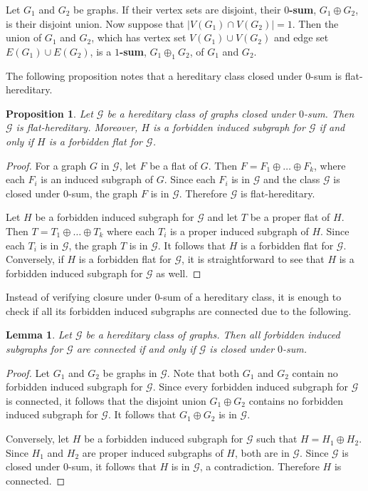 \documentclass[11pt]{amsart}
\newtheorem{lemma}[theorem]{Lemma}
\newtheorem{proposition}[theorem]{Proposition}
\theoremstyle{definition}
\theoremstyle{remark}
\numberwithin{equation}{section}
\begin{document}
Let $G_1$ and $G_2$ be graphs. If their vertex sets are disjoint, their {\bf $0$-sum}, $G_1 \oplus G_2$, is their disjoint union. Now suppose that $|V(G_1) \cap V(G_2)| = 1$. Then the union of $G_1$ and $G_2$, which has vertex set $V(G_1) \cup V(G_2)$ and edge set $E(G_1) \cup E(G_2)$, is a {\bf $1$-sum}, $G_1 \oplus_1 G_2$, of $G_1$ and $G_2$.


The following proposition notes that a hereditary class closed under $0$-sum is flat-hereditary.


\begin{proposition}
\label{prop_b}
Let $\mathcal{G}$ be a hereditary class of graphs closed under $0$-sum. Then $\mathcal{G}$ is flat-hereditary. Moreover, $H$ is a forbidden induced subgraph for $\mathcal{G}$ if and only if $H$ is a forbidden flat for $\mathcal{G}$.
\end{proposition}

\begin{proof}

For a graph $G$ in $\mathcal{G}$, let $F$ be a flat of $G$. Then $F = F_1 \oplus \ldots \oplus F_k$, where each $F_i$ is an induced subgraph of $G$. Since each $F_i$ is in $\mathcal{G}$ and the class $\mathcal{G}$ is closed under $0$-sum, the graph $F$ is in $\mathcal{G}$. Therefore $\mathcal{G}$ is flat-hereditary. 

Let $H$ be a forbidden induced subgraph for $\mathcal{G}$ and let $T$ be a proper flat of $H$. Then $T = T_1 \oplus \ldots \oplus T_k$ where each $T_i$ is a proper induced subgraph of $H$. Since each $T_i$ is in $\mathcal{G}$, the graph $T$ is in $\mathcal{G}$. It follows that $H$ is a forbidden flat for $\mathcal{G}$. Conversely, if $H$ is a forbidden flat for $\mathcal{G}$, it is straightforward to see that $H$ is a forbidden induced subgraph for $\mathcal{G}$ as well.
\end{proof}


Instead of verifying closure under $0$-sum of a hereditary class, it is enough to check if all its forbidden induced subgraphs are connected due to the following.

\begin{lemma}
\label{prelim}
Let $\mathcal{G}$ be a hereditary class of graphs. Then all forbidden induced subgraphs for $\mathcal{G}$ are connected if and only if $\mathcal{G}$ is closed under $0$-sum.
\end{lemma}

\begin{proof}
Let $G_1$ and $G_2$ be graphs in $\mathcal{G}$. Note that both $G_1$ and $G_2$ contain no forbidden induced subgraph for $\mathcal{G}$. Since every forbidden induced subgraph for $\mathcal{G}$ is connected, it follows that the disjoint union $G_1 \oplus G_2$ contains no forbidden induced subgraph for $\mathcal{G}$. It follows that $G_1 \oplus G_2$ is in $\mathcal{G}$. 

Conversely, let $H$ be a forbidden induced subgraph for $\mathcal{G}$ such that $H = H_1 \oplus H_2$. Since $H_1$ and $H_2$ are proper induced subgraphs of $H$, both are in $\mathcal{G}$. Since $\mathcal{G}$ is closed under $0$-sum, it follows that $H$ is in $\mathcal{G}$, a contradiction. Therefore $H$ is connected.
\end{proof}
\end{document}
